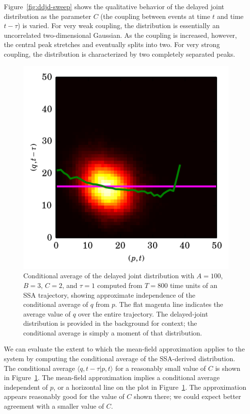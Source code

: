 \documentclass[english,letterpaper,12pt]{report}
\begin{document}
\begin{doublespacing}
Figure~\ref{fig:ddjd-sweep} shows the qualitative behavior of the delayed joint distribution as the parameter $C$ (the coupling between events at time $t$ and time $t - \tau$) is varied. For very weak coupling, the distribution is essentially an uncorrelated two-dimensional Gaussian. As the coupling is increased, however, the central peak stretches and eventually splits into two. For very strong coupling, the distribution is characterized by two completely separated peaks.

\begin{figure}[tb]
    \begin{center}
        \includegraphics{../results/thesis/ddjd-ca-a100-c2-t1.png}
    \end{center}
    \caption{Conditional average of the delayed joint distribution with $A=100$, $B=3$, $C=2$, and $\tau=1$ computed from $T=800$ time units of an SSA trajectory, showing approximate independence of the conditional average of $q$ from $p$. The flat magenta line indicates the average value of $q$ over the entire trajectory. The delayed-joint distribution is provided in the background for context; the conditional average is simply a moment of that distribution.}
    \label{fig:ddjd-stable}
\end{figure}

We can evaluate the extent to which the mean-field approximation applies to the system by computing the conditional average of the SSA-derived distribution. The conditional average $\langle q, t - \tau | p, t \rangle$ for a reasonably small value of $C$ is shown in Figure~\ref{fig:ddjd-stable}. The mean-field approximation implies a conditional average independent of $p$, or a horizontal line on the plot in Figure~\ref{fig:ddjd-stable}. The approximation appears reasonably good for the value of $C$ shown there; we could expect better agreement with a smaller value of $C$.


\end{doublespacing}
\end{document}
